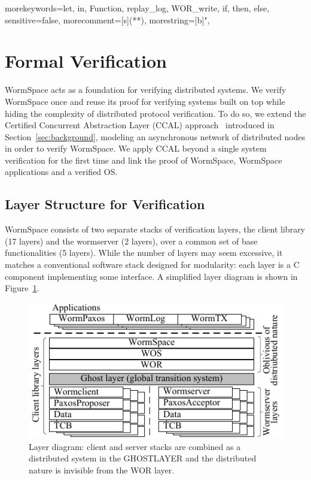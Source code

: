 {morekeywords={let, in, Function, replay_log, WOR_write, if, then, else},
sensitive=false,
morecomment=[s]{(*}{*)},
morestring=[b]",
}



\section{Formal Verification}\label{sec:formal_verification}



	WormSpace acts as a foundation for verifying distributed systems. We verify WormSpace once and reuse its proof for verifying systems built on top while hiding the complexity of distributed protocol verification. To do so, we extend the Certified Concurrent Abstraction Layer (CCAL) approach~\cite{deepspec, concurrency} introduced in Section~\ref{sec:background}, modeling an asynchronous network of distributed nodes in order to verify WormSpace. We apply CCAL beyond a single system verification for the first time and link the proof of WormSpace, WormSpace applications and a verified OS. 


\subsection{Layer Structure for Verification}



WormSpace consists of two separate stacks of verification layers, the client library (17 layers) and the wormserver (2 layers), over a common set of base functionalities (5 layers). While the number of layers may seem excessive, it matches a conventional software stack designed for modularity: each layer is a C component implementing some interface. A simplified layer diagram is shown in Figure~\ref{fig:layerdiagram}.

\begin{figure}
\centering
\includegraphics{figs/multipaxos/layer_diagram.pdf}
\caption{Layer diagram: client and server stacks are combined as a distributed system in the GHOSTLAYER and the distributed nature is invisible from the WOR layer.}
\label{fig:layerdiagram}
\vspace{-0.1in}
\end{figure}


